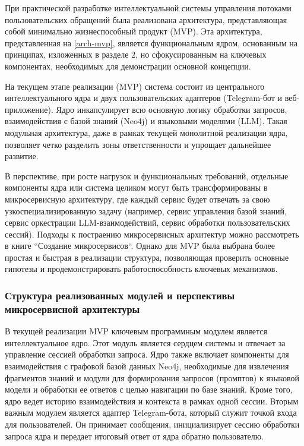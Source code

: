 При практической разработке интеллектуальной системы управления потоками пользовательских обращений была реализована архитектура, представляющая собой минимально жизнеспособный продукт (MVP). Эта архитектура, представленная на \ref{arch-mvp}, является функциональным ядром, основанным на принципах, изложенных в разделе 2, но сфокусированным на ключевых компонентах, необходимых для демонстрации основной концепции.


На текущем этапе реализации (MVP) система состоит из центрального интеллектуального ядра и двух пользовательских адаптеров (Telegram-бот и веб-приложение). Ядро инкапсулирует всю основную логику обработки запросов, взаимодействия с базой знаний (Neo4j) и языковыми моделями (LLM). Такая модульная архитектура, даже в рамках текущей монолитной реализации ядра, позволяет четко разделить зоны ответственности и упрощает дальнейшее развитие.

В перспективе, при росте нагрузок и функциональных требований, отдельные компоненты ядра или система целиком могут быть трансформированы в микросервисную архитектуру, где каждый сервис будет отвечать за свою узкоспециализированную задачу (например, сервис управления базой знаний, сервис оркестрации LLM-взаимодействий, сервис обработки пользовательских сессий). Подходы к постраению микросервисных архитектур можно рассмотреть в книге ``Создание микросервисов``\cite{Newman2015}. Однако для MVP была выбрана более простая и быстрая в реализации структура, позволяющая проверить основные гипотезы и продемонстрировать работоспособность ключевых механизмов.

\subsubsection{Структура реализованных модулей и перспективы микросервисной архитектуры}

В текущей реализации MVP ключевым программным модулем является интеллектуальное ядро. Этот модуль является сердцем системы и отвечает за управление сессией обработки запроса. Ядро также включает компоненты для взаимодействия с графовой базой данных Neo4j, необходимые для извлечения фрагментов знаний и модули для формирования запросов (промптов) к языковой модели и обработки ее ответов с целью навигации по базе знаний. Кроме того, ядро ведет историю взаимодействия и контекста в рамках одной сессии. Вторым важным модулем является адаптер Telegram-бота, который служит точкой входа для пользователей. Он принимает сообщения, инициализирует сессию обработки запроса ядра и передает итоговый ответ от ядра обратно пользователю.

